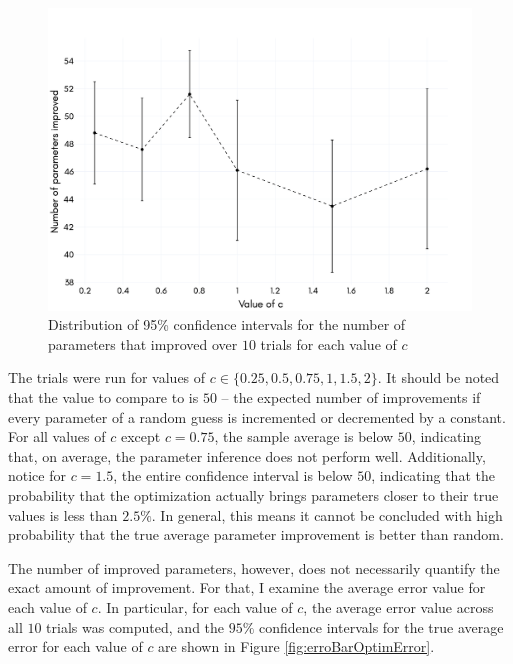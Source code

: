 \documentclass[12pt]{article}
\theoremstyle{definition}
\begin{document}
\vspace{-0.5in}

\begin{figure}[hbt!]
    \par
    \begin{center}
    \caption{Distribution of 95\% confidence intervals for the number of parameters that improved over $10$ trials for each value of $c$}
    \label{fig:errorBarNumImproved}
    \includegraphics[scale=0.15]{Figures/error_bars_num_params_improved.png}
    \end{center}
    \par
    \vspace{-0.25in}
    \medskip
\end{figure}

The trials were run for values of $c \in \{0.25, 0.5, 0.75, 1, 1.5, 2\}$. It should be noted that the value to compare to is $50$ -- the expected number of improvements if every parameter of a random guess is incremented or decremented by a constant. For all values of $c$ except $c=0.75$, the sample average is below $50$, indicating that, on average, the parameter inference does not perform well. Additionally, notice for $c=1.5$, the entire confidence interval is below $50$, indicating that the probability that the optimization actually brings parameters closer to their true values is less than $2.5\%$. In general, this means it cannot be concluded with high probability that the true average parameter improvement is better than random. 

The number of improved parameters, however, does not necessarily quantify the exact amount of improvement. For that, I examine the average error value for each value of $c$. In particular, for each value of $c$, the average error value across all $10$ trials was computed, and the $95\%$ confidence intervals for the true average error for each value of $c$ are shown in Figure \ref{fig:erroBarOptimError}.
\end{document}
